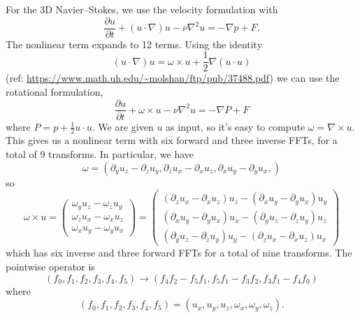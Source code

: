 \documentclass[12pt]{article}
\renewcommand{\(}{\left(}
\renewcommand{\)}{\right)}
\begin{document}
For the 3D Navier--Stokes, we use the velocity
formulation with
\begin{dmath}
  \frac{\partial u}{\partial t}
  + \(u \cdot \nabla  \) u
  - \nu \nabla^2 u
  =
  - \nabla p
  + F.
\end{dmath}
The nonlinear term expands to 12 terms.  Using the identity
\begin{dmath}
  \(u\cdot \nabla\) u
  = \omega \times u + \frac{1}{2} \nabla \(u \cdot u\)
\end{dmath}
(ref: \url{https://www.math.uh.edu/~molshan/ftp/pub/37488.pdf}) we can
use the rotational formulation,
\begin{dmath}
  \frac{\partial u}{\partial t}
  + \omega \times u
  - \nu \nabla^2 u
  =
  - \nabla P
  + F
\end{dmath}
where $P = p + \frac{1}{2}u\cdot{}u$. We are given $u$ as input, so
it's easy to compute $\omega = \nabla \times u$.  This gives us a
nonlinear term with six forward and three inverse FFTs, for a total of
9 transforms.  In particular, we have
\begin{dmath}
  \label{omegadef}
  \omega
  = \(
  \partial_y u_z - \partial_z u_y,
  \partial_z u_x -\partial_x u_z,
  \partial_x u_y - \partial_y u_x,
  \)
\end{dmath}
so
\begin{dmath}
  \omega \times u
  =
  \(
  \begin{matrix}
  \omega_y u_z - \omega_z u_y\\
  \omega_z u_x -\omega_x u_z\\
  \omega_x u_y - \omega_y u_x
  \end{matrix}
  \)
  =
  \(
  \begin{matrix}
    \(\partial_z u_x -\partial_x u_z\) u_z
    - \(\partial_x u_y - \partial_y u_x\) u_y\\
    \(\partial_x u_y - \partial_y u_x\) u_x
    -\(\partial_y u_z - \partial_z u_y\) u_z\\
    \( \partial_y u_z - \partial_z u_y\) u_y
    - \(\partial_z u_x -\partial_x u_z\) u_x
  \end{matrix}
  \)
\end{dmath}
which has six inverse and three forward FFTs for a total of nine
transforms.  The pointwise operator is
\begin{dmath}
  \(f_0, f_1, f_2, f_3, f_4, f_5\)
  \rightarrow
  \(
  f_4 f_2 - f_5 f_1,
  f_5 f_1 - f_3 f_2,
  f_3 f_1 - f_4 f_0
  \)
\end{dmath}
where
\begin{dmath}
  \(f_0, f_1, f_2, f_3, f_4, f_5\)
  =
  \(u_x, u_y, u_z, \omega_x, \omega_y, \omega_z\).
\end{dmath}
\end{document}
